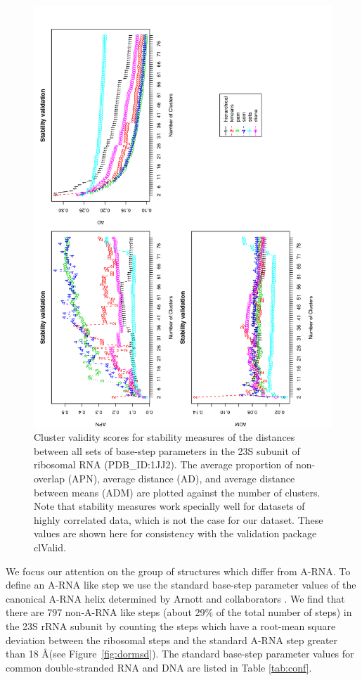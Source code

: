 \begin{figure}
 \centering
\includegraphics[angle=0, scale=0.34]{Chapter2/STval_sta.png}
\caption{Cluster  validity  scores   for  stability  measures  of  the
distances between all sets of  base-step parameters in the 23S subunit
of ribosomal RNA (PDB\_ID:1JJ2). The average proportion of non-overlap
(APN), average distance (AD), and average distance between means (ADM)
are  plotted  against the  number  of  clusters.  Note that  stability
measures work  specially well for datasets of  highly correlated data,
which is  not the case for  our dataset.  These values  are shown here
for consistency with the validation package clValid.}
 \label{fig:stability}
\end{figure}

We focus  our attention on the  group of structures  which differ from
A-RNA.  To  define an  A-RNA like step  we use the  standard base-step
parameter values of the canonical A-RNA helix determined by Arnott and
collaborators \cite{arnott1973}.  We find that there are 797 non-A-RNA
like steps (about  29\% of the total number of steps)  in the 23S rRNA
subunit by counting the steps  which have a root-mean square deviation
between the ribosomal  steps and the standard A-RNA  step greater than
18 \AA (see Figure~\ref{fig:dormsd}). The standard base-step parameter
values  for common  double-stranded RNA  and DNA  are listed  in Table
\ref{tab:conf}.

